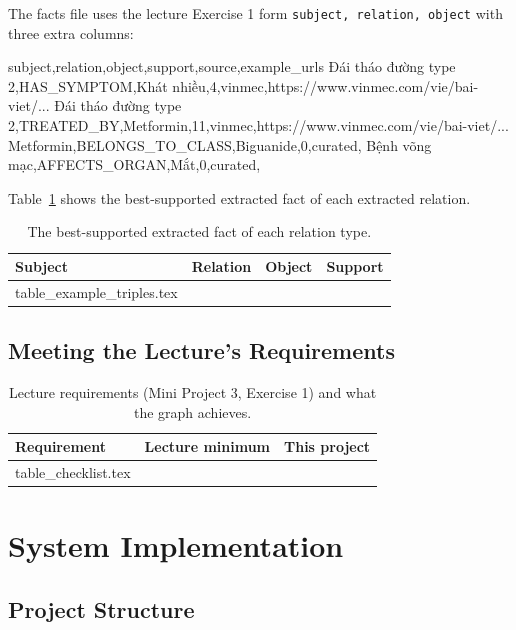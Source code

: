 \documentclass[11pt, a4paper]{article}
\makeatletter
\newcommand{\tabinput}[1]{\@@input #1 }   %
\newcommand{\code}[1]{\texttt{#1}}
\makeatother
\begin{document}
The facts file uses the lecture Exercise 1 form \code{subject, relation, object} with three extra columns:

\begin{codeblock}
subject,relation,object,support,source,example_urls
Đái tháo đường type 2,HAS_SYMPTOM,Khát nhiều,4,vinmec,https://www.vinmec.com/vie/bai-viet/...
Đái tháo đường type 2,TREATED_BY,Metformin,11,vinmec,https://www.vinmec.com/vie/bai-viet/...
Metformin,BELONGS_TO_CLASS,Biguanide,0,curated,
Bệnh võng mạc,AFFECTS_ORGAN,Mắt,0,curated,
\end{codeblock}

Table~\ref{tab:example-triples} shows the best-supported extracted fact of each extracted relation.

\begin{table}[H]
\centering
\small
\caption{The best-supported extracted fact of each relation type.}
\label{tab:example-triples}
\begin{tabular}{l l l r}
\toprule
Subject & Relation & Object & Support \\
\midrule
\tabinput{table_example_triples.tex}
\bottomrule
\end{tabular}
\end{table}

\subsection{Meeting the Lecture's Requirements}
\label{sec:checklist}

\begin{table}[H]
\centering
\small
\caption{Lecture requirements (Mini Project 3, Exercise 1) and what the graph achieves.}
\label{tab:checklist}
\begin{tabularx}{\textwidth}{l X X}
\toprule
Requirement & Lecture minimum & This project \\
\midrule
\tabinput{table_checklist.tex}
\bottomrule
\end{tabularx}
\end{table}

\section{System Implementation}
\label{sec:implementation}

\subsection{Project Structure}
\end{document}
